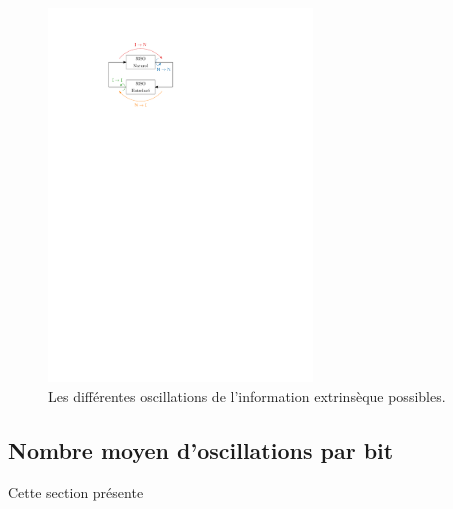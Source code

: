 \begin{figure}[h!]
	\centering
	\includegraphics[width=7cm]{main/ch2_fig/ipe/osc.pdf}
	\caption{\label{fig:osc}Les différentes oscillations de l'information extrinsèque possibles.}
\end{figure}

\subsection{Nombre moyen d'oscillations par bit}
Cette section présente 

